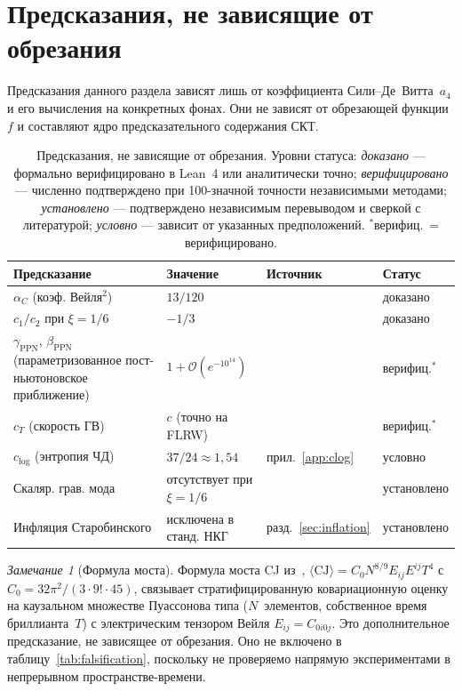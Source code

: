 \documentclass[12pt,a4paper]{article}
\theoremstyle{plain}
\theoremstyle{definition}
\theoremstyle{remark}
\newtheorem{remark}[theorem]{Замечание}
\newcommand{\order}{\mathcal{O}}
\begin{document}
\section{Предсказания, не зависящие от обрезания}
\label{sec:robust}

Предсказания данного раздела зависят лишь от коэффициента
Сили--Де~Витта~$a_4$ и его вычисления на конкретных фонах.
Они не зависят от обрезающей функции~$f$ и составляют ядро
предсказательного содержания СКТ.

\begin{table}[ht]
\centering
\caption{Предсказания, не зависящие от обрезания. Уровни
статуса: \emph{доказано} --- формально верифицировано в Lean~4
или аналитически точно; \emph{верифицировано} --- численно
подтверждено при 100-значной точности независимыми методами;
\emph{установлено} --- подтверждено независимым перевыводом и
сверкой с литературой; \emph{условно} --- зависит от указанных
предположений. ${}^*$верифиц.\ = верифицировано.}
\label{tab:robust}
\begin{tabular}{p{4.2cm}lll}
\toprule
Предсказание & Значение & Источник & Статус \\
\midrule
$\alpha_C$ (коэф. Вейля${}^2$) & $13/120$ & \cite{Alfyorov:2026paper1} & доказано \\
$c_1/c_2$ при $\xi = 1/6$ & $-1/3$ & \cite{Alfyorov:2026paper1} & доказано \\
$\gamma_{\mathrm{PPN}}$, $\beta_{\mathrm{PPN}}$ (параметризованное пост-ньютоновское приближение) &
  $1 + \order(e^{-10^{14}})$ & \cite{Alfyorov:2026paper2} & верифиц.${}^*$ \\
$c_T$ (скорость ГВ) & $c$ (точно на FLRW) & \cite{Alfyorov:2026paper4} & верифиц.${}^*$ \\
$c_{\log}$ (энтропия ЧД) & $37/24 \approx 1{,}54$ & прил.~\ref{app:clog} & условно \\
Скаляр. грав. мода & отсутствует при $\xi = 1/6$ & \cite{CCM:2006,vS:2015} & установлено \\
Инфляция Старобинского & исключена в станд. НКГ & разд.~\ref{sec:inflation} & установлено \\
\bottomrule
\end{tabular}
\end{table}

\begin{remark}[Формула моста]
Формула моста CJ из~\cite{Alfyorov:2026paper7},
$\langle \mathrm{CJ} \rangle = C_0 N^{8/9} E_{ij}E^{ij} T^4$
с $C_0 = 32\pi^2/(3 \cdot 9! \cdot 45)$, связывает
стратифицированную ковариационную оценку на каузальном множестве
Пуассонова типа ($N$~элементов, собственное время
бриллианта~$T$) с электрическим тензором Вейля
$E_{ij} = C_{0i0j}$. Это дополнительное предсказание, не зависящее
от обрезания. Оно не включено в таблицу~\ref{tab:falsification},
поскольку не проверяемо напрямую экспериментами в непрерывном
пространстве-времени.
\end{remark}
\end{document}
